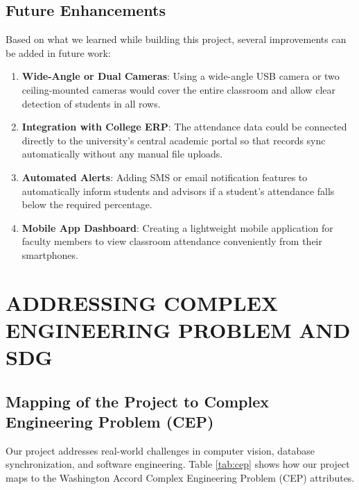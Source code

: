 \documentclass[10pt]{report}
\begin{document}
\section{Future Enhancements}
\hspace{0.5cm}Based on what we learned while building this project, several improvements can be added in future work:
\begin{enumerate}
    \item \textbf{Wide-Angle or Dual Cameras}: Using a wide-angle USB camera or two ceiling-mounted cameras would cover the entire classroom and allow clear detection of students in all rows.
    \item \textbf{Integration with College ERP}: The attendance data could be connected directly to the university's central academic portal so that records sync automatically without any manual file uploads.
    \item \textbf{Automated Alerts}: Adding SMS or email notification features to automatically inform students and advisors if a student's attendance falls below the required percentage.
    \item \textbf{Mobile App Dashboard}: Creating a lightweight mobile application for faculty members to view classroom attendance conveniently from their smartphones.
\end{enumerate}

\chapter{ADDRESSING COMPLEX ENGINEERING PROBLEM AND SDG}
\linespread{1.5}

\section{Mapping of the Project to Complex Engineering Problem (CEP)}
\hspace{0.5cm}Our project addresses real-world challenges in computer vision, database synchronization, and software engineering. Table \ref{tab:cep} shows how our project maps to the Washington Accord Complex Engineering Problem (CEP) attributes.
\end{document}

